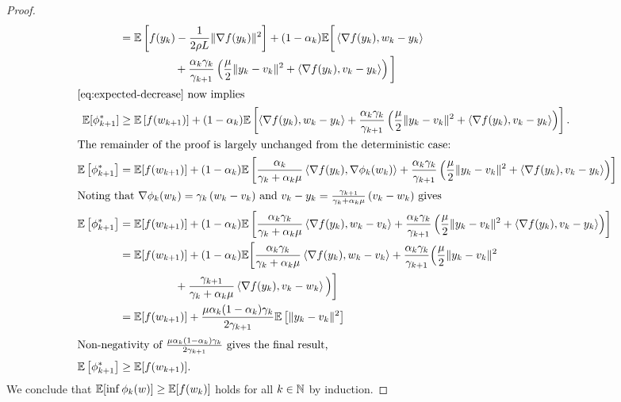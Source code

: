 \begin{proof}
\begin{align*}
        &=  \E\sbr{f(\yk) - \frac{1}{2\sgc L} \norm{\grad(\yk)}^2} + (1-\alpha_k) \E\bigg[\abr{\grad(\yk), \wk - \yk} \\ & \hspace{5em} + \frac{\alpha_k\gamma_k}{\gamma_{k+1}}\rbr{\frac{\mu}{2} \norm{\yk - v_k}^2 + \abr{\grad(\yk), v_k - \yk}}\bigg] \\
        \intertext{\autoref{eq:expected-decrease} now implies}
        \E[\phi_{k+1}^*] &\geq \E\sbr{f(\wkk)} + (1-\alpha_k) \E\sbr{\abr{\grad(\yk), \wk - \yk} + \frac{\alpha_k\gamma_k}{\gamma_{k+1}}\rbr{\frac{\mu}{2} \norm{\yk - v_k}^2 + \abr{\grad(\yk), v_k - \yk}}}. \\
        \intertext{The remainder of the proof is largely unchanged from the deterministic case:}
        \E\sbr{\phi_{k+1}^*}  &=  \E[f(\wkk)] + (1-\alpha_k) \E\sbr{\frac{\alpha_k}{\gamma_k + \alpha_k \mu} \abr{\grad(\yk), \nabla\phi_k(\wk)} + \frac{\alpha_k\gamma_k}{\gamma_{k+1}}\rbr{\frac{\mu}{2} \norm{\yk - v_k}^2 + \abr{\grad(\yk), v_k - \yk}}} \\
        \intertext{Noting that \( \nabla \phi_k(\wk) = \gamma_k \rbr{\wk - v_k} \) and \( v_k - \yk = \frac{\gamma_{k+1}}{\gamma_k + \alpha_k \mu}\rbr{v_k - \wk} \) gives }
        \E\sbr{\phi_{k+1}^*} &= \E[f(\wkk)] +(1-\alpha_k) \E\sbr{\frac{\alpha_k \gamma_k}{\gamma_k + \alpha_k \mu} \abr{\grad(\yk), \wk - v_k} + \frac{\alpha_k\gamma_k}{\gamma_{k+1}}\rbr{\frac{\mu}{2} \norm{\yk - v_k}^2 + \abr{\grad(\yk), v_k - \yk}}} \\
        &= \E[f(\wkk)] + (1-\alpha_k) \E\bigg[\frac{\alpha_k \gamma_k}{\gamma_k + \alpha_k \mu} \abr{\grad(\yk), \wk - v_k} + \frac{\alpha_k\gamma_k}{\gamma_{k+1}}\Big(\frac{\mu}{2} \norm{\yk - v_k}^2 \\
        & \hspace{5em} + \frac{\gamma_{k+1}}{\gamma_k + \alpha_k \mu} \abr{\grad(\yk), v_k - \wk}\Big)\bigg] \\
        &= \E[f(\wkk)] + \frac{\mu \alpha_k(1-\alpha_k)\gamma_k}{2 \gamma_{k+1}} \E\sbr{\norm{\yk - v_k}^2} \\
        \intertext{Non-negativity of \( \frac{\mu \alpha_k(1-\alpha_k)\gamma_k}{2 \gamma_{k+1}} \) gives the final result,} 
        \E\sbr{\phi_{k+1}^*} &\geq \E[f(\wkk)].
    \end{align*}
    We conclude that \( \mathbb{E}[\inf \phi_{k}(w)] \geq \mathbb{E}[f(w_k)] \) holds for all \( k \in \mathbb{N} \) by induction. 
\end{proof}

\newpage

